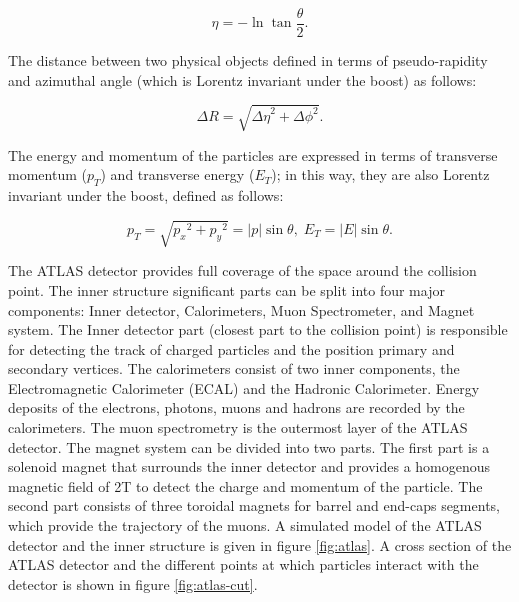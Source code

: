 \begin{equation}
\eta = - \ln \tan{\frac{\theta}{2}}.
\label{eqn:pseudorapidity}
\end{equation}

The distance between two physical objects defined in terms of pseudo-rapidity and azimuthal angle (which is Lorentz invariant under the boost) as follows:

\begin{equation}
\Delta R = \sqrt{{\Delta\eta}^2 +{\Delta\phi}^2}.
\label{eqn:deltaR}
\end{equation}

The energy and momentum of the particles are expressed in terms of transverse momentum ($p_{T}$) and transverse energy ($E_{T}$); in this way, they are also Lorentz invariant under the boost, defined as follows:

\begin{equation}
p_{T} = \sqrt{{p_{x}}^2 +{p_{y}}^2} = |p|\sin{\theta}, \; E_{T} = |E|\sin{\theta}.
\label{eqn:energymomentum}
\end{equation}

The ATLAS detector provides full coverage of the space around the collision point. The inner structure significant parts can be split into four major components: Inner detector, Calorimeters, Muon Spectrometer, and Magnet system. The Inner detector part (closest part to the collision point) is responsible for detecting the track of charged particles and the position primary and secondary vertices. The calorimeters consist of two inner components, the Electromagnetic Calorimeter (ECAL) and the Hadronic Calorimeter. Energy deposits of the electrons, photons, muons and hadrons are recorded by the calorimeters. The muon spectrometry is the outermost layer of the ATLAS detector. The magnet system can be divided into two parts. The first part is a solenoid magnet that surrounds the inner detector and provides a homogenous magnetic field of 2T to detect the charge and momentum of the particle. The second part consists of three toroidal magnets for barrel and end-caps segments, which provide the trajectory of the muons. A simulated model of the ATLAS detector and the inner structure is given in figure \ref{fig:atlas}. A cross section of the ATLAS detector and the different points at which particles interact with the detector is shown in figure \ref{fig:atlas-cut}.

